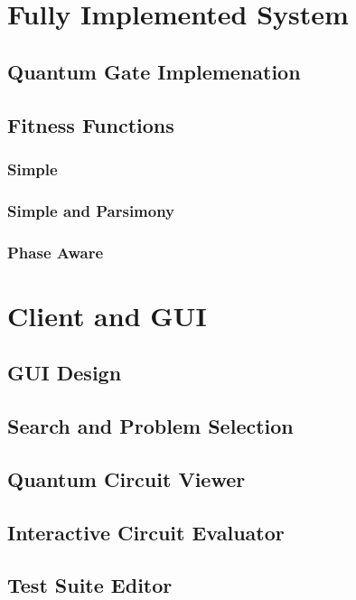 \documentclass[authoryearcitations]{UoYCSproject}
\begin{document}
\section{Fully Implemented System}
\subsection{Quantum Gate Implemenation}


\subsection{Fitness Functions}

\subsubsection{Simple}

\subsubsection{Simple and Parsimony}

\subsubsection{Phase Aware}

\section{Client and GUI}

\subsection{GUI Design}

\subsection{Search and Problem Selection}

\subsection{Quantum Circuit Viewer}

\subsection{Interactive Circuit Evaluator}

\subsection{Test Suite Editor}
\end{document}
